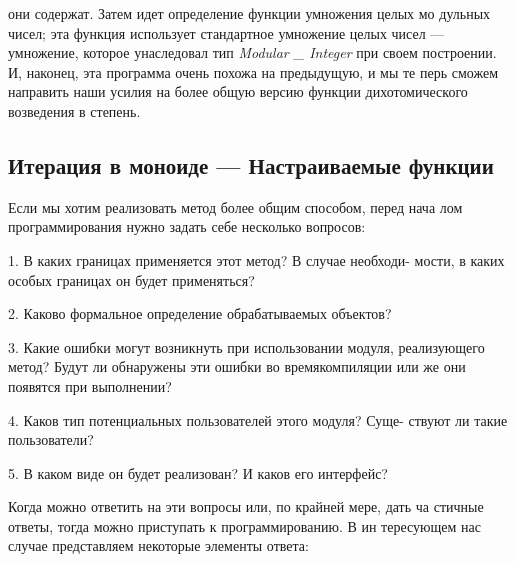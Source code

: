 \documentclass{mai_book}
\begin{document}
\noindent они содержат. Затем идет определение функции умножения целых мо­
дульных чисел; эта функция использует стандартное умножение целых
чисел — умножение, которое унаследовал тип {\it Modular \_ Integer} при своем
построении.
И, наконец, эта программа очень похожа на предыдущую, и мы те­
перь сможем направить наши усилия на более общую версию функции
дихотомического возведения в степень.

\subsection{Итерация в моноиде — Настраиваемые функции}


\noindent Если мы хотим реализовать метод более общим способом, перед нача­
лом программирования нужно задать себе несколько вопросов:
\begin{center}
\parbox{12cm}{
1. В каких границах применяется этот метод? В случае необходи­-
   мости, в каких особых границах он будет применяться?

2. Каково формальное определение обрабатываемых объектов?

3. Какие ошибки могут возникнуть при использовании модуля, ре­ализующего метод?           Будут ли обнаружены эти ошибки во времякомпиляции или же они появятся при выполнении?

4. Каков тип потенциальных пользователей этого модуля? Суще­-
   ствуют ли такие пользователи?

5. В каком виде он будет реализован? И каков его интерфейс?
}
\end{center}
Когда можно ответить на эти вопросы или, по крайней мере, дать ча­
стичные ответы, тогда можно приступать к программированию. В ин­
тересующем нас случае представляем некоторые элементы ответа:
\end{document}
